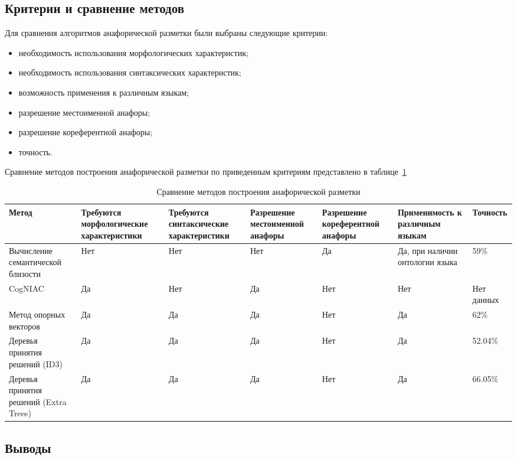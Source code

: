 \subsection{Критерии и сравнение методов}
Для сравнения алгоритмов анафорической разметки были выбраны следующие критерии:
\begin{itemize}
	\item необходимость использования морфологических характеристик;
	\item необходимость использования синтаксических характеристик;
	\item возможность применения к различным языкам;
	\item разрешение местоименной анафоры;
	\item разрешение кореферентной анафоры;
	\item точность.
\end{itemize}

Сравнение методов построения анафорической разметки по приведенным критериям представлено в таблице~\ref{tab:compare_anaphora}

\begin{table}
	\centering
	\caption{Сравнение методов построения анафорической разметки}
	\begin{tabular}{|p{3cm}|p{3cm}|p{3cm}|p{3cm}|p{3cm}|p{3cm}|p{3cm}|}
		\hline
		Метод & Требуются морфологические характеристики & Требуются синтаксические характеристики & Разрешение местоименной анафоры & Разрешение кореферентной анафоры & Применимость к различным языкам & Точность \\\hline
		Вычисление семантической близости & Нет & Нет & Нет & Да & Да, при наличии онтологии языка & 59\%\\\hline
		CogNIAC & Да & Нет & Да & Нет & Нет & Нет данных\\\hline
		Метод опорных векторов & Да & Да & Да & Нет & Да & 62\%\\\hline
		Деревья принятия решений (ID3) & Да  & Да & Да & Нет & Да & 52.04\%\\\hline
		Деревья принятия решений (Extra Trees) & Да & Да & Да & Нет & Да & 66.05\%\\\hline
	\end{tabular}
	\label{tab:compare_anaphora}
\end{table}

\subsection{Выводы}

